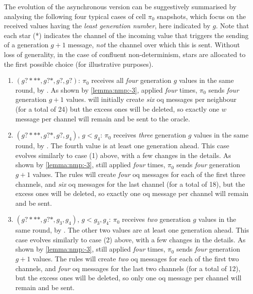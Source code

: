 \begin{remark}\label{remark:nmp:-2}
    The evolution of the asynchronous version can be suggestively summarised by
    analysing the following four typical cases of cell $\pi_0$ snapshots,
    which focus on the received values having the \emph{least generation number}, here indicated by $g$.
    Note that each star (*) indicates the channel of the incoming value 
    that triggers the sending of a generation $g+1$ message, 
    \emph{not} the channel over which this is sent.
    Without loss of generality, in the case of confluent non-determinism,
    stars are allocated to the first possible choice (for illustrative purposes).
    
    \begin{enumerate}
    \item $(g?***, g?*, g?, g?)$: 
    $\pi_0$ receives all \emph{four} generation $g$ values in the same round, by . 
    As shown by \cref{lemma:nmp:-3}, applied \emph{four} times, 
    $\pi_0$ sends \emph{four} generation $g+1$ values.
     will initially create \emph{six} \gls{oq} messages per neighbour (for a total of 24)
    but the excess ones will be deleted, so exactly one \(w\) message per channel will remain and be sent to the oracle.
    
    \medskip
    \item $(g?***, g?*, g?, g_4)$, $g < g_4$: 
    $\pi_0$ receives \emph{three} generation $g$ values in the same round, by .
    The fourth value is at least one generation ahead.    
    This case evolves similarly to case (1) above, with a few changes in the details.
    As shown by \cref{lemma:nmp:-3}, still applied \emph{four} times, 
    $\pi_0$ sends \emph{four} generation $g+1$ values.
    The rules will create \emph{four} \gls{oq} messages for each of the first three channels,
    and \emph{six} \gls{oq} messages for the last channel (for a total of 18),
    but the excess ones will be deleted, so exactly one \gls{oq} message per channel will remain and be sent.
    
    \medskip
    \item $(g?***, g?*, g_3, g_4)$, $g < g_3, g_4$: 
    $\pi_0$ receives \emph{two} generation $g$ values in the same round, by .
    The other two values are at least one generation ahead.    
    This case evolves similarly to case (2) above, with a few changes in the details.
    As shown by \cref{lemma:nmp:-3}, still applied \emph{four} times, 
    $\pi_0$ sends \emph{four} generation $g+1$ values.
    The rules will create \emph{two} \gls{oq} messages for each of the first two channels,
    and \emph{four} \gls{oq} messages for the last two channels (for a total of 12),
    but the excess ones will be deleted, so only one \gls{oq} message per channel will remain and be sent.
    

\end{enumerate}
\end{remark}
